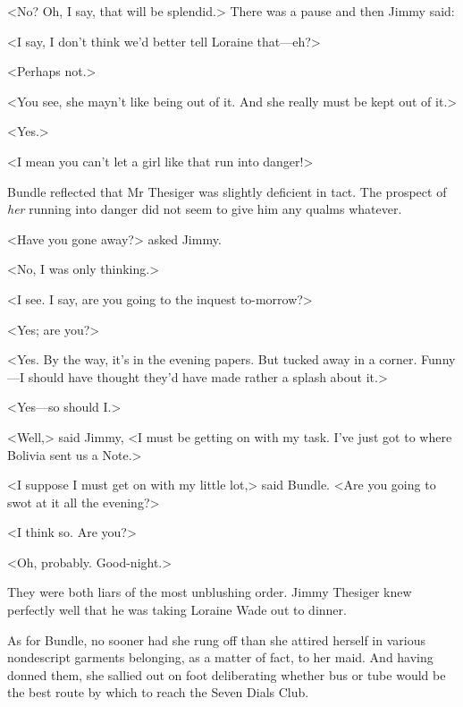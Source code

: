 <No? Oh, I say, that will be splendid.> There was a pause and then Jimmy said:

<I say, I don't think we'd better tell Loraine that—eh?>

<Perhaps not.>

<You see, she mayn't like being out of it. And she really must be kept out of it.>

<Yes.>

<I mean you can't let a girl like that run into danger!>

Bundle reflected that Mr Thesiger was slightly deficient in tact. The prospect of \emph{her} running into danger did not seem to give him any qualms whatever.

<Have you gone away?> asked Jimmy.

<No, I was only thinking.>

<I see. I say, are you going to the inquest to-morrow?>

<Yes; are you?>

<Yes. By the way, it's in the evening papers. But tucked away in a corner. Funny—I should have thought they'd have made rather a splash about it.>

<Yes—so should I.>

<Well,> said Jimmy, <I must be getting on with my task. I've just got to where Bolivia sent us a Note.>

<I suppose I must get on with my little lot,> said Bundle. <Are you going to swot at it all the evening?>

<I think so. Are you?>

<Oh, probably. Good-night.>

They were both liars of the most unblushing order. Jimmy Thesiger knew perfectly well that he was taking Loraine Wade out to dinner.

As for Bundle, no sooner had she rung off than she attired herself in various nondescript garments belonging, as a matter of fact, to her maid. And having donned them, she sallied out on foot deliberating whether bus or tube would be the best route by which to reach the Seven Dials Club.